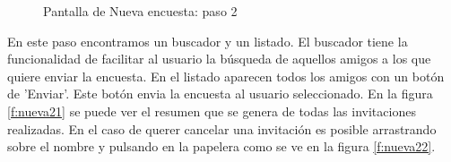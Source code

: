 \documentclass[a4paper, 12pt]{book}
\begin{document}
\begin{figure}[H]
 \centering
 \caption{Pantalla de Nueva encuesta: paso 2}
 \label{f:enviar_encuesta}
\end{figure}


En este paso encontramos un buscador y un listado. El buscador tiene la funcionalidad de facilitar al usuario
la b\'usqueda de aquellos amigos a los que quiere enviar la encuesta. En el listado aparecen todos los amigos
con un bot\'on de 'Enviar'. Este bot\'on envia la encuesta al usuario seleccionado. En la figura \ref{f:nueva21} 
se puede ver el resumen que se genera de todas las invitaciones realizadas. En el caso de querer cancelar
una invitaci\'on es posible arrastrando sobre el nombre y pulsando en la papelera como se ve en la figura \ref{f:nueva22}. 
\end{document}
